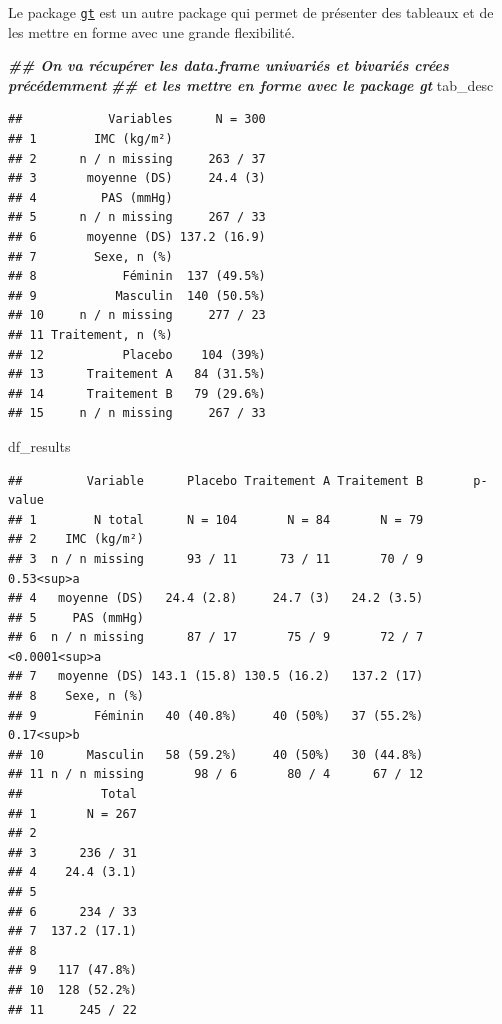 \documentclass[
]{book}
\newenvironment{Shaded}{\begin{snugshade}}{\end{snugshade}}
\newcommand{\DocumentationTok}[1]{\textcolor[rgb]{0.56,0.35,0.01}{\textbf{\textit{#1}}}}
\newcommand{\NormalTok}[1]{#1}
\begin{document}
Le package \href{https://gt.rstudio.com/}{\texttt{gt}} est un autre package qui permet de présenter des tableaux et de les mettre en forme avec une grande flexibilité.

\begin{Shaded}
\begin{Highlighting}[]
\DocumentationTok{\#\# On va récupérer les data.frame univariés et bivariés crées précédemment }
\DocumentationTok{\#\# et les mettre en forme avec le package gt}
\NormalTok{tab\_desc}
\end{Highlighting}
\end{Shaded}

\begin{verbatim}
##            Variables      N = 300
## 1        IMC (kg/m²)             
## 2      n / n missing     263 / 37
## 3       moyenne (DS)     24.4 (3)
## 4         PAS (mmHg)             
## 5      n / n missing     267 / 33
## 6       moyenne (DS) 137.2 (16.9)
## 7        Sexe, n (%)             
## 8            Féminin  137 (49.5%)
## 9           Masculin  140 (50.5%)
## 10     n / n missing     277 / 23
## 11 Traitement, n (%)             
## 12           Placebo    104 (39%)
## 13      Traitement A   84 (31.5%)
## 14      Traitement B   79 (29.6%)
## 15     n / n missing     267 / 33
\end{verbatim}

\begin{Shaded}
\begin{Highlighting}[]
\NormalTok{df\_results}
\end{Highlighting}
\end{Shaded}

\begin{verbatim}
##         Variable      Placebo Traitement A Traitement B       p-value
## 1        N total      N = 104       N = 84       N = 79              
## 2    IMC (kg/m²)                                                     
## 3  n / n missing      93 / 11      73 / 11       70 / 9    0.53<sup>a
## 4   moyenne (DS)   24.4 (2.8)     24.7 (3)   24.2 (3.5)              
## 5     PAS (mmHg)                                                     
## 6  n / n missing      87 / 17       75 / 9       72 / 7 <0.0001<sup>a
## 7   moyenne (DS) 143.1 (15.8) 130.5 (16.2)   137.2 (17)              
## 8    Sexe, n (%)                                                     
## 9        Féminin   40 (40.8%)     40 (50%)   37 (55.2%)    0.17<sup>b
## 10      Masculin   58 (59.2%)     40 (50%)   30 (44.8%)              
## 11 n / n missing       98 / 6       80 / 4      67 / 12              
##           Total
## 1       N = 267
## 2              
## 3      236 / 31
## 4    24.4 (3.1)
## 5              
## 6      234 / 33
## 7  137.2 (17.1)
## 8              
## 9   117 (47.8%)
## 10  128 (52.2%)
## 11     245 / 22
\end{verbatim}
\end{document}

